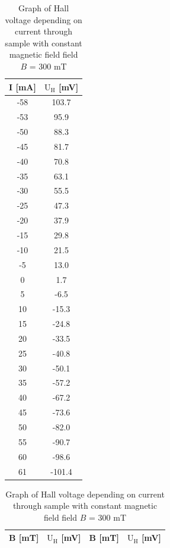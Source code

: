 \documentclass[a4paper,12pt]{article}
\begin{document}
    \begin{table}[H]
    \begin{minipage}[t]{.40\textwidth}
      \centering
      \begin{tabular}{ | c | c |}
        \hline
        I [mA] & $\mathrm{U_H}$ [mV] \\ \hline
        \hline
        -58 & 103.7\\
        -53 & 95.9\\
        -50 & 88.3\\
        -45 & 81.7\\
        -40 & 70.8\\
        -35 & 63.1\\
        -30 & 55.5\\
        -25 & 47.3\\
        -20 & 37.9\\
        -15 & 29.8\\
        -10 & 21.5\\
        -5 & 13.0\\
        0 & 1.7\\
        5 & -6.5\\
        10 & -15.3\\
        15 & -24.8\\
        20 & -33.5\\
        25 & -40.8\\
        30 & -50.1\\
        35 & -57.2\\
        40 & -67.2\\
        45 & -73.6\\
        50 & -82.0\\
        55 & -90.7\\
        60 & -98.6\\
        61 & -101.4\\ \hline
      \end{tabular}
      \caption{Graph of Hall voltage depending on current through sample with constant magnetic field field $B$ = 300 mT}
    \end{minipage}\qquad
    \begin{minipage}[t]{.40\textwidth}
      \centering
      \begin{tabular}{ | c | c || c | c |}
        \hline
        B [mT] & $\mathrm{U_H}$ [mV] & B [mT] & $\mathrm{U_H}$ [mV]\\ \hline


\end{tabular}
\end{minipage}
\end{table}
\end{document}
